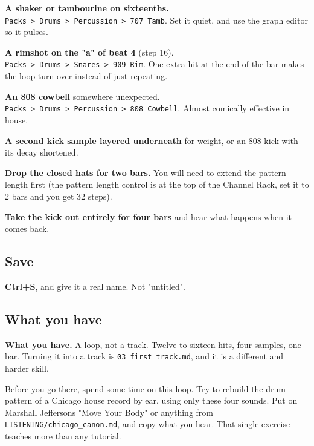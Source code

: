 \textbf{A shaker or tambourine on sixteenths.} \texttt{Packs\ \textgreater{}\ Drums\ \textgreater{}\ Percussion\ \textgreater{}\ 707\ Tamb}. Set it
quiet, and use the graph editor so it pulses.

\textbf{A rimshot on the "a" of beat 4} (step 16). \texttt{Packs\ \textgreater{}\ Drums\ \textgreater{}\ Snares\ \textgreater{}\ 909\ Rim}. One extra
hit at the end of the bar makes the loop turn over instead of just repeating.

\textbf{An 808 cowbell} somewhere unexpected. \texttt{Packs\ \textgreater{}\ Drums\ \textgreater{}\ Percussion\ \textgreater{}\ 808\ Cowbell}. Almost
comically effective in house.

\textbf{A second kick sample layered underneath} for weight, or an 808 kick with its decay
shortened.

\textbf{Drop the closed hats for two bars.} You will need to extend the pattern length first
(the pattern length control is at the top of the Channel Rack, set it to 2 bars and you get
32 steps).

\textbf{Take the kick out entirely for four bars} and hear what happens when it comes back.

\subsection{Save}\label{fl02_first_beat-save}

\textbf{Ctrl+S}, and give it a real name. Not "untitled".

\subsection{What you have}\label{fl02_first_beat-what-you-have}

\begin{reviewbox}
\textbf{What you have.} A loop, not a track. Twelve to sixteen hits, four samples, one bar.
Turning it into a track is \texttt{03\_first\_track.md}, and it is a different and harder skill.
\end{reviewbox}

Before you go there, spend some time on this loop. Try to rebuild the drum pattern of a
Chicago house record by ear, using only these four sounds. Put on Marshall Jefferson\textquotesingle s "Move
Your Body" or anything from \texttt{LISTENING/chicago\_canon.md}, and copy what you hear. That single
exercise teaches more than any tutorial.
